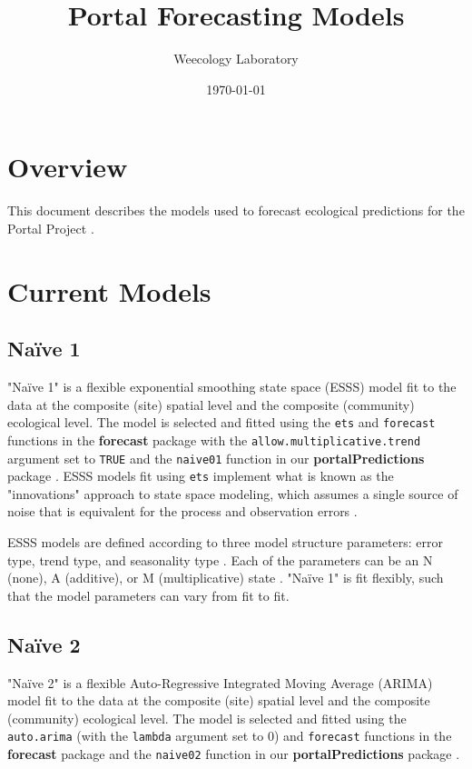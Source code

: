 \documentclass{article}
\title{Portal Forecasting Models}
\author[1]{Weecology Laboratory}
\affil[1]{University of Florida}
\date{\today}
\def\code#1{\texttt{#1}}
\begin{document}
\maketitle
\tableofcontents

\section*{Overview}
\label{sec:overview}

This document describes the models used to forecast ecological predictions for the Portal Project \citep{Brown1998, PortalPredictions}. 

\section{Current Models}
\label{sec:currmods}

\subsection{Na\"{i}ve 1}
\label{subsec:naive01}

"Na\"{i}ve 1" is a flexible exponential smoothing state space (ESSS) model \citep{Hyndman2008} fit to the data at the composite (site) spatial level and the composite (community) ecological level. The model is selected and fitted using the \code{ets} and \code{forecast} functions in the \textbf{forecast} package \citep{Hyndman2017} with the \code{allow.multiplicative.trend} argument set to \code{TRUE} and the \code{naive01} function in our \textbf{portalPredictions} package \citep{PortalPredictions}. ESSS models fit using \code{ets} implement what is known as the "innovations" approach to state space modeling, which assumes a single source of noise that is equivalent for the process and observation errors \citep{Hyndman2008}.

ESSS models are defined according to three model structure parameters: error type, trend type, and seasonality type \citep{Hyndman2008}. Each of the parameters can be an N (none), A (additive), or M (multiplicative) state \citep{Hyndman2008}. "Na\"{i}ve 1" is fit flexibly, such that the model parameters can vary from fit to fit.

\subsection{Na\"{i}ve 2}
\label{subsec:naive02}

"Na\"{i}ve 2" is a flexible Auto-Regressive Integrated Moving Average (ARIMA) model fit to the data at the composite (site) spatial level and the composite (community) ecological level. The model is selected and fitted using the \code{auto.arima} (with the \code{lambda} argument set to 0) and \code{forecast} functions in the \textbf{forecast} package \citep{Hyndman2013, Hyndman2017} and the \code{naive02} function in our \textbf{portalPredictions} package \citep{PortalPredictions}.
\end{document}
